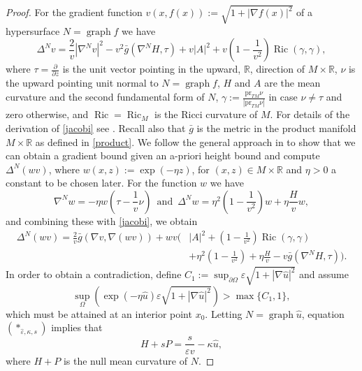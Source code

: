\documentclass[11pt]{amsart}
\DeclareMathOperator{\graph}{graph} \DeclareMathOperator{\closure}{Closure}
\DeclareMathOperator{\Ric}{Ric}    \DeclareMathOperator{\Rm}{Rm}
\def\R{\mathbb{R}}
\begin{document}
\begin{proof} For the gradient function $v(x,f(x)):=\sqrt{1+|\nabla f(x)|^2}$ of a hypersurface  $N=\graph f$ we have
\begin{equation}\label{jacobi}
\Delta^N v=\frac{2}{v}|\nabla^N v|^2-v^2\bar g(\nabla^N H,\tau)+v|A|^2+v\left(1-\frac{1}{v^2}\right)\Ric(\gamma,\gamma),
\end{equation}
where $\tau=\frac{\partial}{\partial z}$ is the unit vector pointing in the upward, $\mathbb{R}$, direction of $M\times\mathbb{R}$, $\nu$ is the upward pointing unit normal to $N=\graph f$, $H$ and $A$ are the mean curvature and the second fundamental form of $N$,  $\gamma:=\frac{\text{pr}_{TM}\nu}{|\text{pr}_{TM}\nu|}$ in case $\nu\ne \tau$ and zero otherwise,  and $\Ric=\Ric_M$ is the Ricci curvature of $M$. For details of the derivation of \eqref{jacobi} see \cite[(13)]{S08}. Recall also that $\bar g$ is the metric in the product manifold $M\times\R$ as defined in \eqref{product}.  We follow the general approach in \cite[Lemma 3.2]{S08} to show that we can obtain a gradient bound given an a-priori height bound and compute $\Delta^N(wv)$, where
 $w(x,z):=\exp(-\eta z)$, for $(x,z)\in M\times\R$ and $\eta>0$ a constant to be chosen later. For the function $w$ we have
\[\nabla^N w=-\eta w\left(\tau-\frac1v\nu\right)\,\text{ and }\,\Delta^N w=\eta^2\left(1-\frac{1}{v^2}\right)w+\eta\frac{H}{v}w,\]
and combining these with \eqref{jacobi}, we obtain
\begin{equation}\label{jacobi2}
\begin{split}
\Delta^N(wv)=\frac{2}{v}\bar g(\nabla v,\nabla (wv))+wv\Biggl(&|A|^2+\left(1-\frac{1}{v^2}\right)\Ric(\gamma,\gamma)\\
&+\eta^2\left(1-\frac{1}{v^2}\right)+\eta\frac{H}{v}-v\bar g(\nabla^N H,\tau)\Biggr).
\end{split}
\end{equation}
In order to obtain a contradiction, define $C_1:=\sup_{\partial\Omega}\varepsilon\sqrt{1+|\nabla \hat{u}|^2}$ and assume 
\begin{equation}\label{contradiction1}
\sup_{\Omega}(\exp(-\eta \hat{u})\varepsilon\sqrt{1+|\nabla \hat{u}|^2})>\max\{C_1,1\},
\end{equation}
which must be attained at an interior point $x_0$. Letting $N=\graph\hat{u}$, equation $(*_{\hat{\varepsilon},\kappa, s})$ implies that 
\begin{equation}\label{floweqn}
H+sP=\dfrac{s}{\varepsilon v}-\kappa\hat{u},
\end{equation}
where $H+P$ is the null mean curvature of $N$. 

\end{proof}
\end{document}
